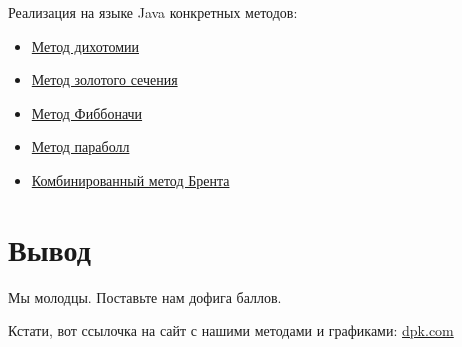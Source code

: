 Реализация на языке Java конкретных методов:
\begin{itemize}
    \item \href{https://github.com/ddd127/metopt_labs/blob/master/src/main/java/com/example/metopt/math/minimization/impl/Dichotomy.java}{Метод дихотомии}
    \item \href{https://github.com/ddd127/metopt_labs/blob/master/src/main/java/com/example/metopt/math/minimization/impl/GoldenRatio.java}{Метод золотого сечения}
    \item \href{https://github.com/ddd127/metopt_labs/blob/master/src/main/java/com/example/metopt/math/minimization/impl/Fibonacci.java}{Метод Фиббоначи}
    \item \href{https://github.com/ddd127/metopt_labs/blob/master/src/main/java/com/example/metopt/math/minimization/impl/Parabola.java}{Метод параболл}
    \item \href{https://github.com/ddd127/metopt_labs/blob/master/src/main/java/com/example/metopt/math/minimization/impl/Brent.java}{Комбинированный метод Брента}
\end{itemize}


\section{Вывод}
Мы молодцы. Поставьте нам дофига баллов.


Кстати, вот ссылочка на сайт с нашими методами и графиками: \href{http://165.232.72.20:8080/}{dpk.com}


